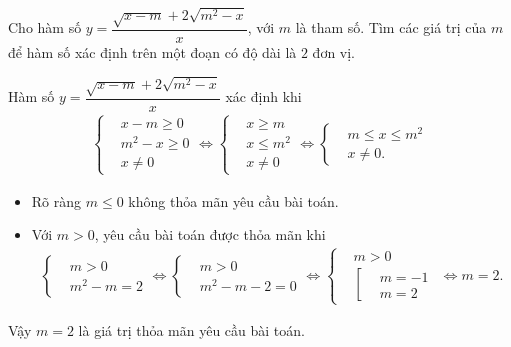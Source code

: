 \begin{bt}%
 Cho hàm số $y=\dfrac{\sqrt{x-m}+2\sqrt{m^2-x}}{x}$, với $m$ là tham số. Tìm các giá trị của $m$ để hàm số xác định trên một đoạn có độ dài là $2$ đơn vị.
 \loigiai
  {
  Hàm số $y=\dfrac{\sqrt{x-m}+2\sqrt{m^2-x}}{x}$ xác định khi
  \begin{eqnarray*}
   \left\{\begin{aligned}&x-m \geq 0 \\&m^2-x \geq 0 \\&x\neq 0\end{aligned}\right. \Leftrightarrow \left\{\begin{aligned}&x \geq m \\&x \leq m^2 \\&x \neq 0\end{aligned}\right. \Leftrightarrow \left\{\begin{aligned}&m \leq x \leq m^2 \\&x \neq 0.\end{aligned}\right.
  \end{eqnarray*}
  \begin{itemize}
   \item Rõ ràng $m\leq 0$ không thỏa mãn yêu cầu bài toán.
   \item Với $m > 0$, yêu cầu bài toán được thỏa mãn khi
   \begin{eqnarray*}
    \left\{\begin{aligned}&m>0 \\&m^2-m=2\end{aligned}\right. \Leftrightarrow \left\{\begin{aligned}&m>0 \\&m^2-m-2=0\end{aligned}\right. \Leftrightarrow \left\{\begin{aligned}&m>0 \\&\left[\begin{aligned}&m=-1 \\&m=2\end{aligned}\right.\end{aligned}\right. \Leftrightarrow m=2.
   \end{eqnarray*}
  \end{itemize}
  Vậy $m=2$ là giá trị thỏa mãn yêu cầu bài toán.
  }
\end{bt}


